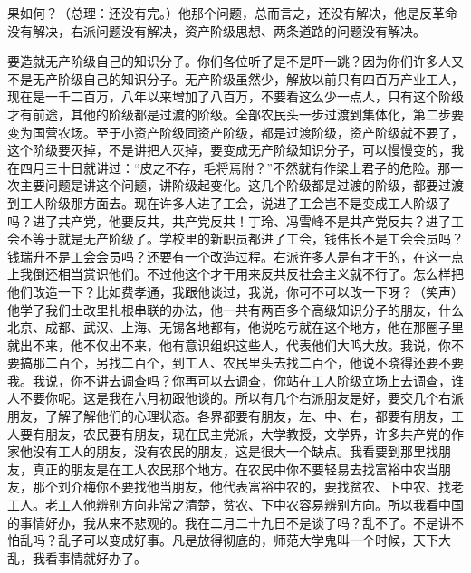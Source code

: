 果如何？（总理：还没有完。）他那个问题，总而言之，还没有解决，他是反革命没有解决，右派问题没有解决，资产阶级思想、两条道路的问题没有解决。

要造就无产阶级自己的知识分子。你们各位听了是不是吓一跳？因为你们许多人又不是无产阶级自己的知识分子。无产阶级虽然少，解放以前只有四百万产业工人，现在是一千二百万，八年以来增加了八百万，不要看这么少一点人，只有这个阶级才有前途，其他的阶级都是过渡的阶级。全部农民头一步过渡到集体化，第二步要变为国营农场。至于小资产阶级同资产阶级，都是过渡阶级，资产阶级就不要了，这个阶级要灭掉，不是讲把人灭掉，要变成无产阶级知识分子，可以慢慢变的，我在四月三十日就讲过：“皮之不存，毛将焉附？”不然就有作梁上君子的危险。那一次主要问题是讲这个问题，讲阶级起变化。这几个阶级都是过渡的阶级，都要过渡到工人阶级那方面去。现在许多人进了工会，说进了工会岂不是变成工人阶级了吗？进了共产党，他要反共，共产党反共！丁玲、冯雪峰不是共产党反共？进了工会不等于就是无产阶级了。学校里的新职员都进了工会，钱伟长不是工会会员吗？钱瑞升不是工会会员吗？还要有一个改造过程。右派许多人是有才干的，在这一点上我倒还相当赏识他们。不过他这个才干用来反共反社会主义就不行了。怎么样把他们改造一下？比如费孝通，我跟他谈过，我说，你可不可以改一下呀？（笑声）他学了我们土改里扎根串联的办法，他一共有两百多个高级知识分子的朋友，什么北京、成都、武汉、上海、无锡各地都有，他说吃亏就在这个地方，他在那圈子里就出不来，他不仅出不来，他有意识组织这些人，代表他们大鸣大放。我说，你不要搞那二百个，另找二百个，到工人、农民里头去找二百个，他说不晓得还要不要我。我说，你不讲去调查吗？你再可以去调查，你站在工人阶级立场上去调查，谁人不要你呢。这是我在六月初跟他谈的。所以有几个右派朋友是好，要交几个右派朋友，了解了解他们的心理状态。各界都要有朋友，左、中、右，都要有朋友，工人要有朋友，农民要有朋友，现在民主党派，大学教授，文学界，许多共产党的作家他没有工人的朋友，没有农民的朋友，这是很大一个缺点。我看要到那里找朋友，真正的朋友是在工人农民那个地方。在农民中你不要轻易去找富裕中农当朋友，那个刘介梅你不要找他当朋友，他代表富裕中农的，要找贫农、下中农、找老工人。老工人他辨别方向非常之清楚，贫农、下中农容易辨别方向。所以我看中国的事情好办，我从来不悲观的。我在二月二十九日不是谈了吗？乱不了。不是讲不怕乱吗？乱子可以变成好事。凡是放得彻底的，师范大学鬼叫一个时候，天下大乱，我看事情就好办了。

